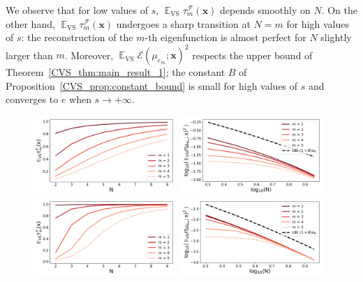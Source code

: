 \documentclass[twoside,11pt]{book}
\numberwithin{theorem}{chapter}
\numberwithin{definition}{chapter}
\numberwithin{proposition}{chapter}
\numberwithin{corollary}{chapter}
\numberwithin{example}{chapter}
\numberwithin{lemma}{chapter}
\numberwithin{assumption}{chapter}
\numberwithin{equation}{chapter}
\numberwithin{figure}{chapter}
\DeclareMathOperator{\VS}{\mathrm{VS}}
\DeclareMathOperator{\EX}{\mathbb{E}}
\DeclareMathOperator{\F}{\mathcal{F}}
\begin{document}
We observe that for low values of $s$, $\EX_{\VS} \tau_{m}^{\F}(\bm{x})$ depends smoothly on $N$. On the other hand, $\EX_{\VS} \tau_{m}^{\F}(\bm{x})$ undergoes a sharp transition at $N = m$ for high values of $s$: the reconstruction of the $m$-th eigenfunction is almost perfect for $N$ slightly larger than $m$. Moreover, $\EX_{\VS} \mathcal{E}(\mu_{e_{m}};\bm{x})^{2}$ respects the upper bound of Theorem~\ref{CVS_thm:main_result_1};
the constant $B$ of Proposition~\ref{CVS_prop:constant_bound} is small for high values of $s$ and converges to $e$ when $s \rightarrow +\infty$.
\begin{figure}[!]\label{CVS_fig:periodic_sobolev}
    \centering
\includegraphics[width= 0.48\textwidth]{img/icml/app/EX_VS_tau_n_s_1_d_1.pdf}~\includegraphics[width= 0.48\textwidth]{img/icml/app/EX_VS_err_n_s_1_d_1_new.pdf}\\
\includegraphics[width= 0.48\textwidth]{img/icml/app/EX_VS_tau_n_s_2_d_1.pdf}~\includegraphics[width= 0.48\textwidth]{img/icml/app/EX_VS_err_n_s_2_d_1_new.pdf}\\

\end{figure}
\end{document}
